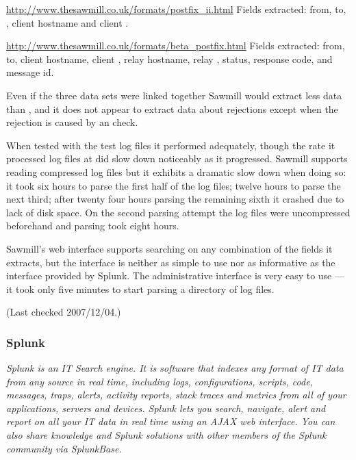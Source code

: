 \url{http://www.thesawmill.co.uk/formats/postfix_ii.html} \newline Fields
extracted: from, to, \RBL{}, client hostname and client \IP{}\@.

\url{http://www.thesawmill.co.uk/formats/beta_postfix.html} \newline Fields
extracted: from, to, client hostname, client \IP{}, relay hostname, relay
\IP{}, status, response code, \RBL{} and message id.

Even if the three data sets were linked together Sawmill would extract less
data than \parsername{}, and it does not appear to extract data about
rejections except when the rejection is caused by an \RBL{} check.

When tested with the \numberOFlogFILES{} test log files it performed
adequately, though the rate it processed log files at did slow down
noticeably as it progressed.  Sawmill supports reading compressed log files
but it exhibits a dramatic slow down when doing so: it took six hours to
parse the first half of the log files; twelve hours to parse the next
third; after twenty four hours parsing the remaining sixth it crashed due
to lack of disk space.  On the second parsing attempt the log files were
uncompressed beforehand and parsing took eight hours.

Sawmill's web interface supports searching on any combination of the fields
it extracts, but the interface is neither as simple to use nor as
informative as the interface provided by Splunk.  The administrative
interface is very easy to use --- it took only five minutes to start
parsing a directory of log files.

(Last checked 2007/12/04.)

\subsubsection{Splunk}

\textit{Splunk is an IT Search engine. It is software that indexes any
format of IT data from any source in real time, including logs,
configurations, scripts, code, messages, traps, alerts, activity reports,
stack traces and metrics from all of your applications, servers and
devices. Splunk lets you search, navigate, alert and report on all your IT
data in real time using an AJAX web interface. You can also share knowledge
and Splunk solutions with other members of the Splunk community via
SplunkBase.\/}

